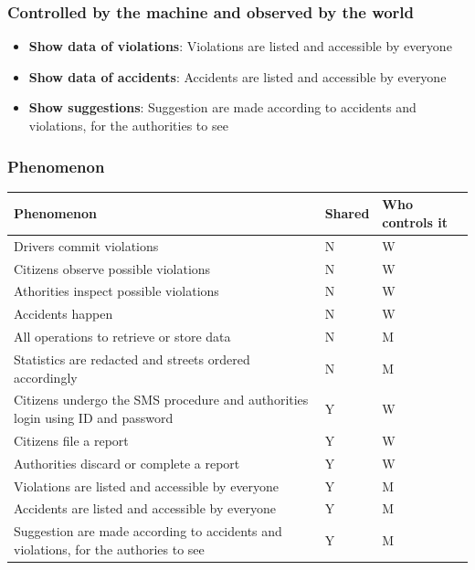 \subsubsection*{Controlled by the machine and observed by the world}

\begin{itemize}

\item \textbf{Show data of violations}: Violations are listed and accessible by everyone

\item \textbf{Show data of accidents}: Accidents are listed and accessible by everyone

\item \textbf{Show suggestions}: Suggestion are made according to accidents and violations, for the authorities to see

\end{itemize}

\subsubsection{Phenomenon}
\begin{tabular}{|l|l|l|}
\hline
\textbf{Phenomenon} & \textbf{Shared} & \textbf{Who controls it} \\ \hline
Drivers commit violations & N & W\\ \hline
Citizens observe possible violations & N & W\\ \hline
Athorities inspect possible violations & N & W\\ \hline
Accidents happen & N & W\\ \hline
All operations to retrieve or store data & N & M\\ \hline
Statistics are redacted and streets ordered accordingly & N & M\\ \hline
Citizens undergo the SMS procedure and authorities login using ID and password & Y & W\\ \hline
Citizens file a report & Y & W\\ \hline
Authorities discard or complete a report & Y & W\\ \hline
Violations are listed and accessible by everyone& Y & M\\ \hline
Accidents are listed and accessible by everyone& Y & M\\ \hline
Suggestion are made according to accidents and violations, for the authories to see & Y & M\\
\hline 
\end{tabular}

